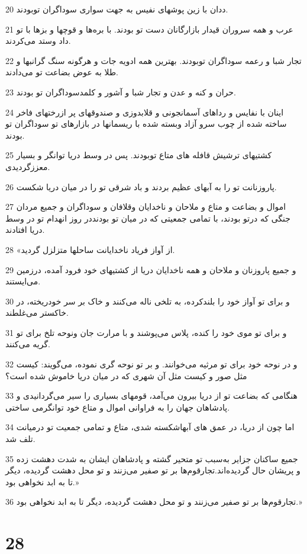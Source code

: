 \par 20 ددان با زین پوشهای نفیس به جهت سواری سوداگران توبودند.
\par 21 عرب و همه سروران قیدار بازارگانان دست تو بودند. با بره‌ها و قوچها و بزها با تو داد وستد می‌کردند.
\par 22 تجار شبا و رعمه سوداگران توبودند. بهترین همه ادویه جات و هرگونه سنگ گرانبها و طلا به عوض بضاعت تو می‌دادند.
\par 23 حران و کنه و عدن و تجار شبا و آشور و کلمدسوداگران تو بودند.
\par 24 اینان با نفایس و رداهای آسمانجونی و قلابدوزی و صندوقهای پر ازرختهای فاخر ساخته شده از چوب سرو آزاد وبسته شده با ریسمانها در بازارهای تو سوداگران تو بودند.
\par 25 کشتیهای ترشیش قافله های متاع توبودند. پس در وسط دریا توانگر و بسیار معززگردیدی.
\par 26 پاروزنانت تو را به آبهای عظیم بردند و باد شرقی تو را در میان دریا شکست.
\par 27 اموال و بضاعت و متاع و ملاحان و ناخدایان وقلافان و سوداگران و جمیع مردان جنگی که درتو بودند، با تمامی جمعیتی که در میان تو بودنددر روز انهدام تو در وسط دریا افتادند.
\par 28 «از آواز فریاد ناخدایانت ساحلها متزلزل گردید.
\par 29 و جمیع پاروزنان و ملاحان و همه ناخدایان دریا از کشتیهای خود فرود آمده، درزمین می‌ایستند.
\par 30 و برای تو آواز خود را بلندکرده، به تلخی ناله می‌کنند و خاک بر سر خودریخته، در خاکستر می‌غلطند.
\par 31 و برای تو موی خود را کنده، پلاس می‌پوشند و با مرارت جان ونوحه تلخ برای تو گریه می‌کنند.
\par 32 و در نوحه خود برای تو مرثیه می‌خوانند. و بر تو نوحه گری نموده، می‌گویند: کیست مثل صور و کیست مثل آن شهری که در میان دریا خاموش شده است؟
\par 33 هنگامی که بضاعت تو از دریا بیرون می‌آمد، قومهای بسیاری را سیر می‌گردانیدی و پادشاهان جهان را به فراوانی اموال و متاع خود توانگرمی ساختی.
\par 34 اما چون از دریا، در عمق های آبهاشکسته شدی، متاع و تمامی جمعیت تو درمیانت تلف شد.
\par 35 جمیع ساکنان جزایر به‌سبب تو متحیر گشته و پادشاهان ایشان به شدت دهشت زده و پریشان حال گردیده‌اند.تجارقوم‌ها بر تو صفیر می‌زنند و تو محل دهشت گردیده، دیگر تا به ابد نخواهی بود.»
\par 36 تجارقوم‌ها بر تو صفیر می‌زنند و تو محل دهشت گردیده، دیگر تا به ابد نخواهی بود.»

\chapter{28}

